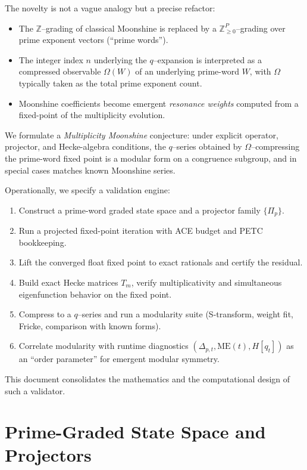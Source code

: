 \documentclass[11pt]{article}
\theoremstyle{definition}
\theoremstyle{plain}
\theoremstyle{remark}
\newcommand{\Zbb}{\mathbb{Z}}
\newcommand{\OmegaVal}{\Omega}
\begin{document}
The novelty is not a vague analogy but a precise refactor:
\begin{itemize}[leftmargin=1.5em]
  \item The $\Zbb$--grading of classical Moonshine is replaced by a $\Zbb_{\ge 0}^P$--grading over prime exponent vectors (``prime words'').
  \item The integer index $n$ underlying the $q$--expansion is interpreted as a compressed observable $\OmegaVal(W)$ of an underlying prime-word $W$, with $\OmegaVal$ typically taken as the total prime exponent count.
  \item Moonshine coefficients become emergent \emph{resonance weights} computed from a fixed-point of the multiplicity evolution.
\end{itemize}

We formulate a \emph{Multiplicity Moonshine} conjecture: under explicit operator, projector, and Hecke-algebra conditions, the $q$--series obtained by $\OmegaVal$--compressing the prime-word fixed point is a modular form on a congruence subgroup, and in special cases matches known Moonshine series.

Operationally, we specify a validation engine:
\begin{enumerate}[leftmargin=1.5em]
  \item Construct a prime-word graded state space and a projector family $\{\Pi_p\}$.
  \item Run a projected fixed-point iteration with ACE budget and PETC bookkeeping.
  \item Lift the converged float fixed point to exact rationals and certify the residual.
  \item Build exact Hecke matrices $T_m$, verify multiplicativity and simultaneous eigenfunction behavior on the fixed point.
  \item Compress to a $q$--series and run a modularity suite (S-transform, weight fit, Fricke, comparison with known forms).
  \item Correlate modularity with runtime diagnostics $(\Delta_{p,t}, \mathrm{ME}(t), H[q_t])$ as an ``order parameter'' for emergent modular symmetry.
\end{enumerate}

This document consolidates the mathematics and the computational design of such a validator.

\section{Prime-Graded State Space and Projectors}
\end{document}
